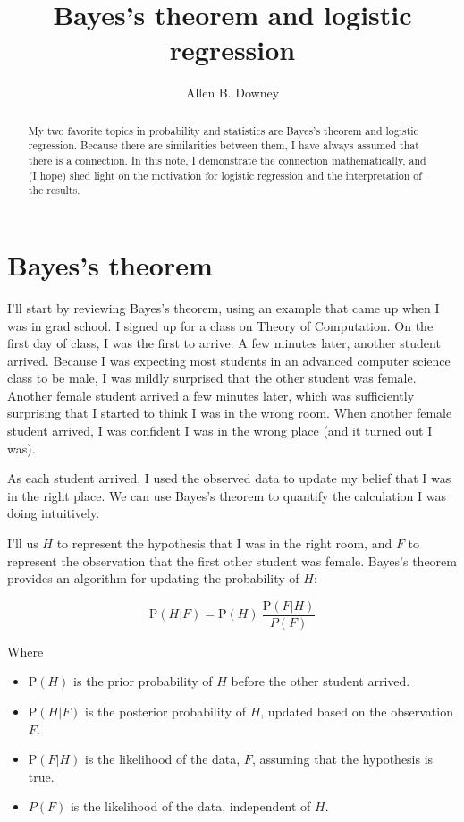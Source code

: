 \documentclass[12pt]{article}
\title{Bayes's theorem and logistic regression}
\author{Allen B. Downey}
\renewcommand{\P}{\mathrm{P}}
\begin{document}
\maketitle

\begin{abstract}
My two favorite topics in probability and statistics are
Bayes's theorem and logistic regression.  Because there are
similarities between them, I have always assumed that there is
a connection.  In this note, I demonstrate the
connection mathematically, and (I hope) shed light on the
motivation for logistic regression and the interpretation of
the results.
\end{abstract}


\section{Bayes's theorem}

I'll start by reviewing Bayes's theorem, using an example that came up
when I was in grad school.  I signed up for a class on Theory of
Computation.  On the first day of class, I was the first to arrive.  A
few minutes later, another student arrived.  Because I was expecting
most students in an advanced computer science class to be male, I was
mildly surprised that the other student was female.  Another female
student arrived a few minutes later, which was sufficiently
surprising that I started to think I was in the wrong room.  When
another female student arrived, I was confident I was in the wrong
place (and it turned out I was).

As each student arrived, I used the observed data to update my
belief that I was in the right place.  We can use Bayes's theorem to
quantify the calculation I was doing intuitively.

I'll us $H$ to represent the hypothesis that I was in the right
room, and $F$ to represent the observation that the first other
student was female.  Bayes's theorem provides an algorithm for
updating the probability of $H$:

\[ \P(H|F) = \P(H)~\frac{\P(F|H)}{P(F)}\]

Where

\begin{itemize}

\item $\P(H)$ is the prior probability of $H$ before the other
student arrived.

\item $\P(H|F)$ is the posterior probability of $H$, updated based
on the observation $F$.

\item $\P(F|H)$ is the likelihood of the data, $F$, assuming that
the hypothesis is true.

\item $P(F)$ is the likelihood of the data, independent of $H$.
 
\end{itemize}
\end{document}
